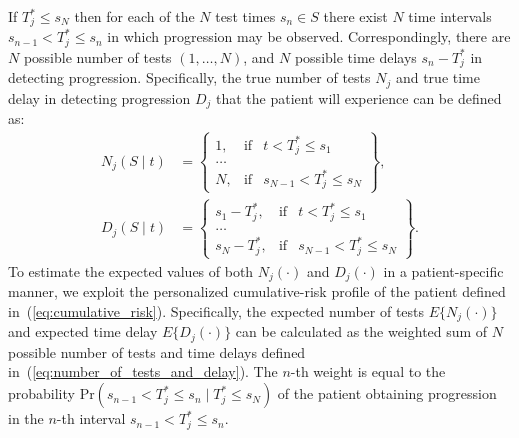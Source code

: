 If $T^*_j \leq s_N$ then for each of the $N$ test times $s_n \in S$ there exist $N$ time intervals ${s_{n-1} < T^*_j \leq s_n}$ in which progression may be observed. Correspondingly, there are $N$ possible number of tests $(1,\ldots, N)$, and $N$ possible time delays $s_n - T^*_j$ in detecting progression. Specifically, the true number of tests $N_j$ and true time delay in detecting progression $D_j$ that the patient will experience can be defined as:
\begin{equation}
\label{eq:number_of_tests_and_delay}
\begin{split}
N_j (S \mid t) &= \left\{ \begin{array}{lcr}
  1, &\mbox{if}& t < T^*_j \leq s_1\\
  \ldots \\
  N, &\mbox{if}& s_{N-1} < T^*_j \leq s_{N}  
\end{array} \right\},\\
D_j (S \mid t) &= \left\{ \begin{array}{lcrr}
  s_1 - T^*_j, &\mbox{if}& t < T^*_j \leq s_1\\
  \ldots \\
  s_N - T^*_j, &\mbox{if}& s_{N-1} < T^*_j \leq s_N  
\end{array} \right\}.
\end{split}
\end{equation}
To estimate the expected values of both $N_j(\cdot)$ and $D_j(\cdot)$ in a patient-specific manner, we exploit the personalized cumulative-risk profile of the patient defined in~(\ref{eq:cumulative_risk}). Specifically, the expected number of tests $E\{N_j(\cdot)\}$ and expected time delay $E\{D_j(\cdot)\}$ can be calculated as the weighted sum of $N$ possible number of tests and time delays defined in~(\ref{eq:number_of_tests_and_delay}). The $n$-th weight is equal to the probability $\mbox{Pr}(s_{n-1} < T^*_j \leq s_n \mid T^*_j \leq s_N)$ of the patient obtaining progression in the $n$-th interval ${s_{n-1} < T^*_j \leq s_n}$.
